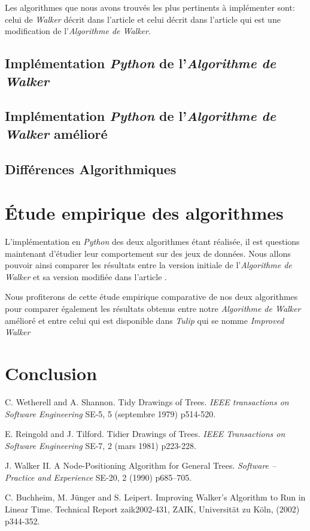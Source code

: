 \documentclass{article}
\begin{document}
Les algorithmes que nous avons trouvés les plus pertinents à implémenter sont: celui de \emph{Walker} décrit dans l'article \cite{article90} et celui décrit dans l'article \cite{article02} qui est une modification de l'\emph{Algorithme de Walker}.

\subsection{Implémentation \emph{Python} de l'\emph{Algorithme de Walker} \cite{article90}}

\subsection{Implémentation \emph{Python} de l'\emph{Algorithme de Walker} amélioré \cite{article02}}

\subsection{Différences Algorithmiques}


\newpage
\section{Étude empirique des algorithmes}

L'implémentation en \emph{Python} des deux algorithmes étant réalisée, il est questions maintenant d'étudier leur comportement sur des jeux de données. Nous allons pouvoir ainsi comparer les résultats entre la version initiale de  l'\emph{Algorithme de Walker} et sa version modifiée dans l'article \cite{article02}.

Nous profiterons de cette étude empirique comparative de nos deux algorithmes pour comparer également les résultats obtenus entre notre \emph{Algorithme de Walker} amélioré et entre celui qui est disponible dans \emph{Tulip} qui se nomme \emph{Improved Walker}


\newpage
\section{Conclusion}




\newpage
\medskip

\begin{thebibliography}{10}

C. Wetherell and A. Shannon. Tidy Drawings of Trees. \textit{IEEE transactions on Software Engineering} SE-5, 5 (septembre 1979) p514-520.

E. Reingold and J. Tilford. Tidier Drawings of Trees. \textit{IEEE Transactions on Software Engineering} SE-7, 2 (mars 1981) p223-228.

J. Walker II. A Node-Positioning Algorithm for General Trees. \textit{Software – Practice and Experience} SE-20, 2 (1990) p685–705.

C. Buchheim, M. Jünger and S. Leipert. Improving Walker’s Algorithm to Run in Linear Time. Technical Report zaik2002-431, ZAIK, Universität zu Köln, (2002) p344-352.

\end{thebibliography}
\end{document}
